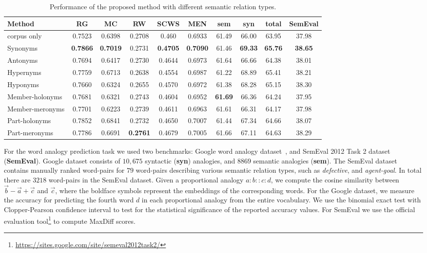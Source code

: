 \documentclass[letterpaper]{article}
\newcommand{\citep}{\cite}
\begin{document}
\begin{table}[t!]
\small
\centering
\caption{Performance of the proposed method with different semantic relation types.}
\label{tbl:overall}
\begin{tabular}{|l|c|c|c|c|c|c|c|c|c|} \hline
Method & RG & MC & RW & SCWS & MEN & sem & syn & total & SemEval \\ \hline \hline
corpus only  & 0.7523 & 0.6398 & 0.2708 & 0.460 & 0.6933 & 61.49 & 66.00 & 63.95 & 37.98 \\
Synonyms & \textbf{0.7866} & \textbf{0.7019} & 0.2731 & \textbf{0.4705} & \textbf{0.7090} & 61.46 & \textbf{69.33} & \textbf{65.76} & \textbf{38.65} \\
Antonyms & 0.7694 & 0.6417 & 0.2730 & 0.4644 & 0.6973 & 61.64 & 66.66 & 64.38 & 38.01 \\
Hypernyms & 0.7759 & 0.6713 & 0.2638 & 0.4554 & 0.6987 & 61.22 & 68.89 & 65.41 & 38.21 \\
Hyponyms & 0.7660 & 0.6324 & 0.2655 & 0.4570 & 0.6972 & 61.38 & 68.28 & 65.15 & 38.30 \\
Member-holonyms & 0.7681 & 0.6321 & 0.2743 & 0.4604 & 0.6952 & \textbf{61.69} & 66.36 & 64.24 & 37.95 \\
Member-meronyms & 0.7701 & 0.6223 & 0.2739 & 0.4611 & 0.6963 & 61.61 & 66.31 & 64.17 & 37.98 \\
Part-holonyms & 0.7852 & 0.6841 & 0.2732 & 0.4650 & 0.7007 & 61.44 & 67.34 & 64.66 & 38.07 \\
Part-meronyms & 0.7786 & 0.6691 & \textbf{0.2761} & 0.4679 & 0.7005 & 61.66 & 67.11 & 64.63 & 38.29 \\
\hline
\end{tabular}
\end{table}

For the word analogy prediction task we used two benchmarks: Google word analogy dataset~\citep{Mikolov:NIPS:2013},
and SemEval 2012 Task 2 dataset~\citep{SemEavl2012:Task2} (\textbf{SemEval}).
Google dataset consists of $10,675$ syntactic (\textbf{syn}) analogies, and $8869$ semantic analogies (\textbf{sem}).
The SemEval dataset contains manually ranked word-pairs
for $79$ word-pairs describing various semantic relation types, such as \emph{defective}, and \emph{agent-goal}.
In total there are $3218$ word-pairs in the SemEval dataset.
Given a proportional analogy  $a:b :: c:d$, we compute the cosine similarity between $\vec{b} - \vec{a} + \vec{c}$ and
$\vec{c}$, where the boldface symbols represent the embeddings of the corresponding words. For the Google dataset, we measure the
accuracy for predicting the fourth word $d$ in each proportional analogy from the entire vocabulary.
We use the binomial exact test with Clopper-Pearson confidence interval to test for the statistical significance of
the reported accuracy values.
For SemEval we use the official evaluation tool\footnote{\url{https://sites.google.com/site/semeval2012task2/}}
to compute MaxDiff scores.
\end{document}

